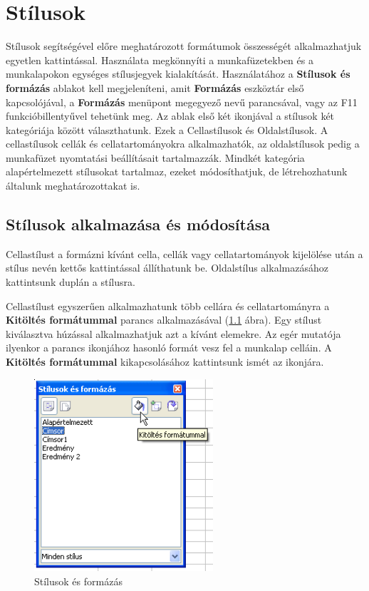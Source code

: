 \chapter{Stílusok}
\thispagestyle{empty}

Stílusok segítségével előre meghatározott formátumok
összességét alkalmazhatjuk egyetlen kattintással. Használata
megkönnyíti a munkafüzetekben és a munkalapokon egységes
stílusjegyek kialakítását. Használatához a
\textbf{Stílusok és formázás} ablakot kell megjeleníteni,
amit \textbf{Formázás} eszköztár első kapcsolójával, a
\textbf{Formázás} menüpont megegyező nevű parancsával,
vagy az F11 funkcióbillentyűvel tehetünk meg. Az ablak első
két ikonjával a stílusok két kategóriája között
választhatunk. Ezek a Cellastílusok és Oldalstílusok. A
cellastílusok cellák és cellatartományokra alkalmazhatók, az
oldalstílusok pedig a munkafüzet nyomtatási beállításait
tartalmazzák. Mindkét kategória alapértelmezett stílusokat
tartalmaz, ezeket módosíthatjuk, de létrehozhatunk általunk
meghatározottakat is.


\section{Stílusok alkalmazása és módosítása}

Cellastílust a formázni kívánt cella, cellák vagy
cellatartományok kijelölése után a stílus nevén kettős
kattintással állíthatunk be. Oldalstílus alkalmazásához
kattintsunk duplán a stílusra.

Cellastílust egyszerűen alkalmazhatunk több cellára és
cellatartományra a \textbf{Kitöltés formátummal}  parancs
alkalmazásával (\ref{StílusokFormázás} ábra). Egy stílust kiválasztva
húzással alkalmazhatjuk azt a kívánt elemekre. Az egér
mutatója ilyenkor a parancs ikonjához hasonló formát vesz fel a
munkalap celláin. A \textbf{Kitöltés formátummal}
kikapcsolásához kattintsunk ismét az ikonjára.

\begin{figure}[!h]
\begin{center}
\includegraphics[width=6.644cm]{oocalcv1-img157.png}
\caption{Stílusok és formázás}\label{StílusokFormázás}
\end{center}
\end{figure}

